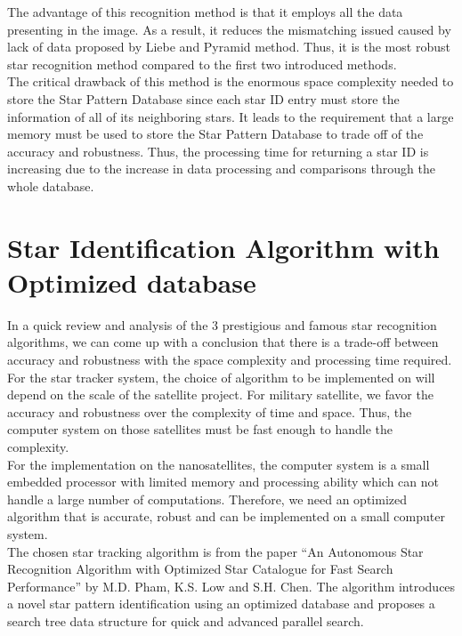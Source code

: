 \noindent The advantage of this recognition method is that it employs all the data presenting in the image. As a result, it reduces the mismatching issued caused by lack of data proposed by Liebe and Pyramid method. Thus, it is the most robust star recognition method compared to the first two introduced methods. \\

\noindent The critical drawback of this method is the enormous space complexity needed to store the Star Pattern Database since each star ID entry must store the information of all of its neighboring stars. It leads to the requirement that a large memory must be used to store the Star Pattern Database to trade off of the accuracy and robustness. Thus, the processing time for returning a star ID is increasing due to the increase in data processing and comparisons through the whole database.

\section{Star Identification Algorithm with Optimized database}

In a quick review and analysis of the 3 prestigious and famous star recognition algorithms, we can come up with a conclusion that there is a trade-off between accuracy and robustness with the space complexity and processing time required. For the star tracker system, the choice of algorithm to be implemented on will depend on the scale of the satellite project. For military satellite, we favor the accuracy and robustness over the complexity of time and space. Thus, the computer system on those satellites must be fast enough to handle the complexity. \\

\noindent For the implementation on the nanosatellites, the computer system is a small embedded processor with limited memory and processing ability which can not handle a large number of computations. Therefore, we need an optimized algorithm that is accurate, robust and can be implemented on a small computer system. \\

\noindent The chosen star tracking algorithm is from the paper ``An Autonomous Star Recognition Algorithm with Optimized Star Catalogue for Fast Search Performance'' by M.D. Pham, K.S. Low and S.H. Chen\cite{edselc.2-52.0-8487677997120120101,edseee.655799920130101}. The algorithm introduces a novel star pattern identification using an optimized database and proposes a search tree data structure for quick and advanced parallel search. \\

